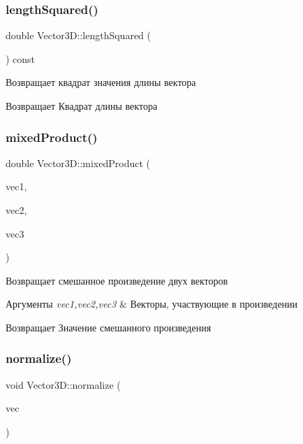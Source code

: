 \subsubsection{\texorpdfstring{length\+Squared()}{lengthSquared()}}
{\footnotesize\ttfamily double Vector3\+D\+::length\+Squared (\begin{DoxyParamCaption}{ }\end{DoxyParamCaption}) const}

Возвращает квадрат значения длины вектора \begin{DoxyReturn}{Возвращает}
Квадрат длины вектора 
\end{DoxyReturn}
\mbox{\label{class_vector3_d_ac9fc2d629f5edaf274bbcc767804c5ff}} 
\subsubsection{\texorpdfstring{mixed\+Product()}{mixedProduct()}}
{\footnotesize\ttfamily double Vector3\+D\+::mixed\+Product (\begin{DoxyParamCaption}\item[{const \mbox{\hyperlink{class_vector3_d}{Vector3D}} \&}]{vec1,  }\item[{const \mbox{\hyperlink{class_vector3_d}{Vector3D}} \&}]{vec2,  }\item[{const \mbox{\hyperlink{class_vector3_d}{Vector3D}} \&}]{vec3 }\end{DoxyParamCaption})\hspace{0.3cm}{\ttfamily [static]}}

Возвращает смешанное произведение двух векторов 
\begin{DoxyParams}{Аргументы}
{\em vec1,vec2,vec3} & Векторы, участвующие в произведении \\
\hline
\end{DoxyParams}
\begin{DoxyReturn}{Возвращает}
Значение смешанного произведения 
\end{DoxyReturn}
\mbox{\label{class_vector3_d_acee0e4ffb2a89c454b1d68e0c01e511b}} 
\subsubsection{\texorpdfstring{normalize()}{normalize()}}
{\footnotesize\ttfamily void Vector3\+D\+::normalize (\begin{DoxyParamCaption}\item[{\mbox{\hyperlink{class_vector3_d}{Vector3D}} \&}]{vec }\end{DoxyParamCaption})}

